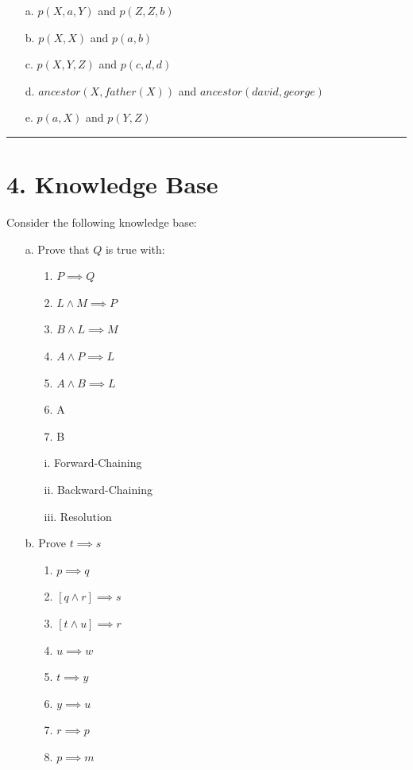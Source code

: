 \documentclass[11pt]{article}
\begin{document}
\begin{flushleft}
\begin{enumerate}
    \item[a.] $p(X, a, Y)$ and $p(Z, Z, b)$
    \item[b.] $p(X, X)$ and $p(a, b)$
    \item[c.] $p(X, Y, Z)$ and $p(c, d, d)$
    \item[d.] $ancestor(X, father(X))$ and $ancestor(david, george)$
    \item[e.] $p(a, X)$ and $p(Y,Z)$

\end{enumerate}

\rule[0.1pt]{40em}{1.0pt}

\section*{4. Knowledge Base} Consider the following knowledge base:

\begin{enumerate}

    \item[a.] Prove that $Q$ is true with:

        \begin{enumerate}
            \item[1.] $P \implies Q$
            \item[2.] $L \land M \implies P$
            \item[3.] $B \land L \implies M$
            \item[4.] $A \land P \implies L$
            \item[5.] $A \land B \implies L$
            \item[6.] A
            \item[7.] B
        \end{enumerate}

        \begin{enumerate}
            \item[i.] Forward-Chaining
            \item[ii.] Backward-Chaining
            \item[iii.] Resolution
        \end{enumerate}

    \item[b.] Prove $t \implies s$

        \begin{enumerate}
            \item[1.] $p \implies q$
            \item[2.] $[q \land r] \implies s$
            \item[3.] $[t \land u] \implies r$
            \item[4.] $u \implies w$
            \item[5.] $t \implies y$
            \item[6.] $y \implies u$
            \item[7.] $r \implies p$
            \item[8.] $p \implies m$
        \end{enumerate}


\end{enumerate}
\end{flushleft}
\end{document}
